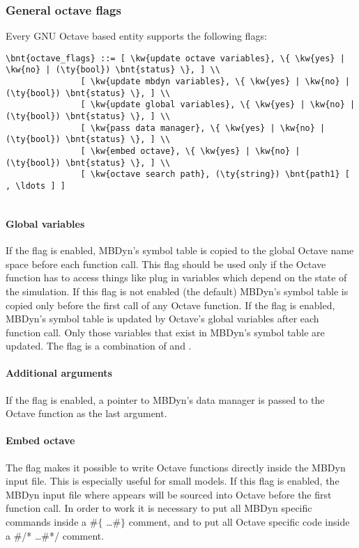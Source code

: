 \subsubsection{General octave flags}
Every GNU Octave based entity supports the following flags:
\begin{Verbatim}[commandchars=\\\{\}]
	\bnt{octave_flags} ::= [ \kw{update octave variables}, \{ \kw{yes} | \kw{no} | (\ty{bool}) \bnt{status} \}, ] \\
			   [ \kw{update mbdyn variables}, \{ \kw{yes} | \kw{no} | (\ty{bool}) \bnt{status} \}, ] \\
			   [ \kw{update global variables}, \{ \kw{yes} | \kw{no} | (\ty{bool}) \bnt{status} \}, ] \\
			   [ \kw{pass data manager}, \{ \kw{yes} | \kw{no} | (\ty{bool}) \bnt{status} \}, ] \\
			   [ \kw{embed octave}, \{ \kw{yes} | \kw{no} | (\ty{bool}) \bnt{status} \}, ] \\
			   [ \kw{octave search path}, (\ty{string}) \bnt{path1} [ , \ldots ] ]
						   
\end{Verbatim}
\paragraph{Global variables}
If the flag  is enabled, MBDyn's symbol table is copied to the global Octave name space before each function call.
This flag should be used only if the Octave function has to access things like plug in variables which depend on the state of the simulation.
If this flag is not enabled (the default) MBDyn's symbol table is copied only before the first call of any Octave function.
If the flag  is enabled, MBDyn's symbol table is updated by Octave's global variables after each function call.
Only those variables that exist in MBDyn's symbol table are updated.
The flag  is a combination of  and .

\paragraph{Additional arguments}
If the flag  is enabled, a pointer to MBDyn's data manager is passed to the Octave function as the last argument.

\paragraph{Embed octave}
The flag  makes it possible to write Octave functions directly inside the MBDyn input file.
This is especially useful for small models. If this flag is enabled, the MBDyn input file where  appears will be sourced into Octave before the first function call.
In order to work it is necessary to put all MBDyn specific commands inside a $\#\lbrace$ \ldots $\#\rbrace$ comment, and to put all Octave specific code inside a \#/* \ldots \#*/ comment.

